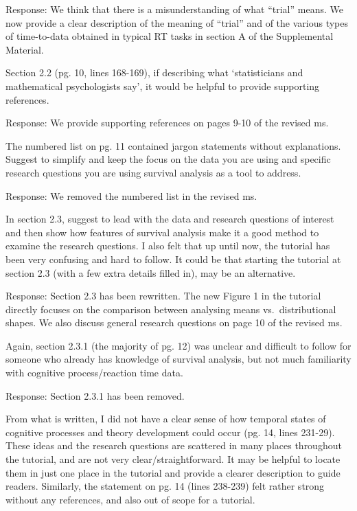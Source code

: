 \documentclass[
]{article}
\renewenvironment{quote}{\begin{leftbar}}{\end{leftbar}}
\begin{document}
Response: We think that there is a misunderstanding of what ``trial''
means. We now provide a clear description of the meaning of ``trial''
and of the various types of time-to-data obtained in typical RT tasks in
section A of the Supplemental Material.

\begin{quote}
Section 2.2 (pg. 10, lines 168-169), if describing what `statisticians
and mathematical psychologists say', it would be helpful to provide
supporting references.
\end{quote}

Response: We provide supporting references on pages 9-10 of the revised
ms.

\begin{quote}
The numbered list on pg. 11 contained jargon statements without
explanations. Suggest to simplify and keep the focus on the data you are
using and specific research questions you are using survival analysis as
a tool to address.
\end{quote}

Response: We removed the numbered list in the revised ms.

\begin{quote}
In section 2.3, suggest to lead with the data and research questions of
interest and then show how features of survival analysis make it a good
method to examine the research questions. I also felt that up until now,
the tutorial has been very confusing and hard to follow. It could be
that starting the tutorial at section 2.3 (with a few extra details
filled in), may be an alternative.
\end{quote}

Response: Section 2.3 has been rewritten. The new Figure 1 in the
tutorial directly focuses on the comparison between analysing means
vs.~distributional shapes. We also discuss general research questions on
page 10 of the revised ms.

\begin{quote}
Again, section 2.3.1 (the majority of pg. 12) was unclear and difficult
to follow for someone who already has knowledge of survival analysis,
but not much familiarity with cognitive process/reaction time data.
\end{quote}

Response: Section 2.3.1 has been removed.

\begin{quote}
From what is written, I did not have a clear sense of how temporal
states of cognitive processes and theory development could occur (pg.
14, lines 231-29). These ideas and the research questions are scattered
in many places throughout the tutorial, and are not very
clear/straightforward. It may be helpful to locate them in just one
place in the tutorial and provide a clearer description to guide
readers. Similarly, the statement on pg. 14 (lines 238-239) felt rather
strong without any references, and also out of scope for a tutorial.
\end{quote}
\end{document}

